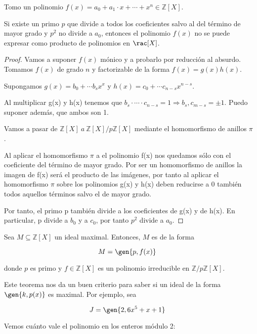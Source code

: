 \documentclass[nochap]{apuntes}
\begin{document}
\begin{theorem}\label{thmEisenstein}
 Tomo un polinomio $f(x)=a_0  +  a_1\cdot x + \cdots + x^{n} \in \mathbb{Z}[X]$.

 Si existe un primo $p$ que divide a todos los coeficientes salvo al del término de mayor grado y $p^2$  no divide a $a_0$, entonces el polinomio $f(x)$ no se puede expresar como producto de polinomios en $\rac[X]$.
\end{theorem}

\begin{proof}
 Vamos a suponer $f(x)$ mónico y a probarlo por reducción al absurdo. Tomamos $f(x)$ de grado $n$ y factorizable de la forma $f(x)=g(x)h(x)$.

 Supongamos $g(x)=b_0+\cdots b_sx^{x}$ y $h(x)=c_0 +\cdots c_{n-s}x^{n-s}$.

 Al multiplicar g(x) y h(x) tenemos que $b_s \cdot \dotsb \cdot c_{n-s} = 1 \Rightarrow b_s,c_{m-s} = \pm 1$. Puedo suponer además, que ambos son 1.

 Vamos a pasar de $\mathbb{Z}[X] \ a \ \mathbb{Z}[X]/p\mathbb{Z}[X]$  mediante el homomorfismo de anillos $\pi$.

 Al aplicar el homomorfismo $\pi$  a el polinomio f(x) nos quedamos sólo con el coeficiente del término de mayor grado. Por ser un homomorfismo de anillos la imagen de f(x) será el producto de las imágenes, por tanto al aplicar el homomorfismo $\pi$  sobre los polinomios g(x) y h(x)  deben reducirse a 0 también todos aquellos términos salvo el de mayor grado.

 Por tanto, el primo p también divide a los coeficientes de g(x) y de h(x). En particular, p divide a $b_0$  y a $c_0$, por tanto $p^2$  divide a $a_0$.
\end{proof}

\begin{theorem}\label{thmMaximalIrreducibleZ} Sea $M⊆ℤ[X]$ un ideal maximal. Entonces, $M$ es de la forma

\[ M = \gen{p, f(x)} \]

donde $p$ es primo y $f∈ℤ[X]$ es un polinomio irreducible en $ℤ/pℤ[X]$.
\end{theorem}

Este teorema nos da un buen criterio para saber si un ideal de la forma $\gen{k, p(x)}$ es maximal. Por ejemplo, sea

\[ J = \gen{2, 6x^5 + x + 1} \]

Vemos cuánto vale el polinomio en los enteros módulo 2:
\end{document}
